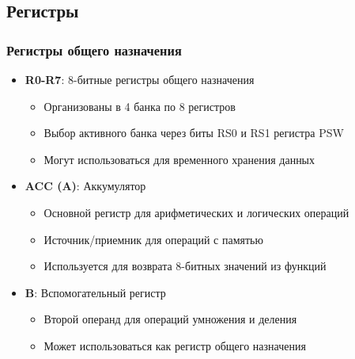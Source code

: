 \documentclass[a4paper, 12pt]{article}
\begin{document}
\subsection{Регистры}
\subsubsection{Регистры общего назначения}
\begin{itemize}
    \item \textbf{R0-R7}: 8-битные регистры общего назначения
    \begin{itemize}
        \item Организованы в 4 банка по 8 регистров
        \item Выбор активного банка через биты RS0 и RS1 регистра PSW
        \item Могут использоваться для временного хранения данных
    \end{itemize}
    \item \textbf{ACC (A)}: Аккумулятор
    \begin{itemize}
        \item Основной регистр для арифметических и логических операций
        \item Источник/приемник для операций с памятью
        \item Используется для возврата 8-битных значений из функций
    \end{itemize}
    \item \textbf{B}: Вспомогательный регистр
    \begin{itemize}
        \item Второй операнд для операций умножения и деления
        \item Может использоваться как регистр общего назначения
    \end{itemize}
\end{itemize}
\end{document}
